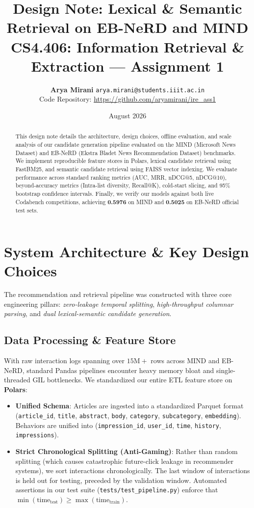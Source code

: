 \documentclass[10pt,twocolumn]{article}
\title{\vspace{-18pt}\textbf{\Large Design Note: Lexical \& Semantic Retrieval on EB-NeRD and MIND}\\[-2pt]
\normalsize CS4.406: Information Retrieval \& Extraction --- Assignment 1}
\author{\textbf{Arya Mirani} \quad \texttt{arya.mirani@students.iiit.ac.in} \\[-2pt]
\normalsize Code Repository: \url{https://github.com/aryamirani/ire_ass1}}
\date{\vspace{-10pt}\normalsize August 2026}
\begin{document}
\maketitle

\begin{abstract}
This design note details the architecture, design choices, offline evaluation, and scale analysis of our candidate generation pipeline evaluated on the MIND (Microsoft News Dataset) and EB-NeRD (Ekstra Bladet News Recommendation Dataset) benchmarks. We implement reproducible feature stores in Polars, lexical candidate retrieval using FastBM25, and semantic candidate retrieval using FAISS vector indexing. We evaluate performance across standard ranking metrics (AUC, MRR, nDCG@5, nDCG@10), beyond-accuracy metrics (Intra-list diversity, Recall@K), cold-start slicing, and 95\% bootstrap confidence intervals. Finally, we verify our models against both live Codabench competitions, achieving \textbf{0.5976} on MIND and \textbf{0.5025} on EB-NeRD official test sets.
\end{abstract}

\section{System Architecture \& Key Design Choices}

The recommendation and retrieval pipeline was constructed with three core engineering pillars: \textit{zero-leakage temporal splitting}, \textit{high-throughput columnar parsing}, and \textit{dual lexical-semantic candidate generation}.

\subsection{Data Processing \& Feature Store}
With raw interaction logs spanning over $15\text{M}+$ rows across MIND and EB-NeRD, standard Pandas pipelines encounter heavy memory bloat and single-threaded GIL bottlenecks. We standardized our entire ETL feature store on \textbf{Polars}:
\begin{itemize}
    \item \textbf{Unified Schema}: Articles are ingested into a standardized Parquet format (\texttt{article\_id}, \texttt{title}, \texttt{abstract}, \texttt{body}, \texttt{category}, \texttt{subcategory}, \texttt{embedding}). Behaviors are unified into (\texttt{impression\_id}, \texttt{user\_id}, \texttt{time}, \texttt{history}, \texttt{impressions}).
    \item \textbf{Strict Chronological Splitting (Anti-Gaming)}: Rather than random splitting (which causes catastrophic future-click leakage in recommender systems), we sort interactions chronologically. The last window of interactions is held out for testing, preceded by the validation window. Automated assertions in our test suite (\texttt{tests/test\_pipeline.py}) enforce that $\min(\text{time}_{\text{test}}) \ge \max(\text{time}_{\text{train}})$.
\end{itemize}
\end{document}
